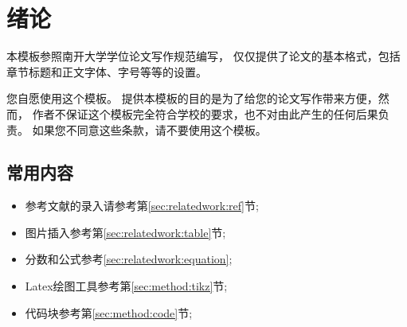 
\chapter{绪论}
\label{chpt:introduction}


本模板参照南开大学学位论文写作规范编写，
仅仅提供了论文的基本格式，包括章节标题和正文字体、字号等等的设置。



您自愿使用这个模板。
提供本模板的目的是为了给您的论文写作带来方便，然而，
作者不保证这个模板完全符合学校的要求，也不对由此产生的任何后果负责。
如果您不同意这些条款，请不要使用这个模板。


\section{常用内容}

\begin{itemize}
  \item 参考文献的录入请参考第\ref{sec:relatedwork:ref}节;
  \item 图片插入参考第\ref{sec:relatedwork:table}节;
  \item 分数和公式参考\ref{sec:relatedwork:equation};  
  \item Latex绘图工具参考第\ref{sec:method:tikz}节;
  \item 代码块参考第\ref{sec:method:code}节; 
\end{itemize}